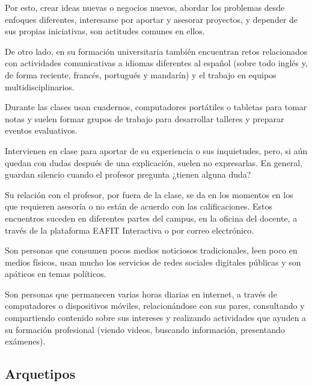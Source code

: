 \documentclass[twoside,letterpaper,11pt]{report}
\begin{document}
Por esto, crear ideas nuevas o negocios nuevos, abordar los problemas desde enfoques diferentes, interesarse por aportar y asesorar proyectos, y depender de sus propias iniciativas, son actitudes comunes en ellos.

De otro lado, en su formación universitaria también encuentran retos relacionados con actividades comunicativas a idiomas diferentes al español (sobre todo inglés y, de forma reciente, francés, portugués y mandarín) y el trabajo en equipos multidisciplinarios.

Durante las clases usan cuadernos, computadores portátiles o tabletas para tomar notas y suelen formar grupos de trabajo para desarrollar talleres y preparar eventos evaluativos. 

Intervienen en clase para aportar de su experiencia o sus inquietudes, pero, si aún quedan con dudas después de una explicación, suelen no expresarlas. En general, guardan silencio cuando el profesor pregunta ¿tienen alguna duda?

Su relación con el profesor, por fuera de la clase, se da en los momentos en los que requieren asesoría o no están de acuerdo con las calificaciones. Estos encuentros suceden en diferentes partes del campus, en la oficina del docente, a través de la plataforma EAFIT Interactiva o por correo electrónico. 

Son personas que consumen pocos medios noticiosos tradicionales, leen poco en medios físicos, usan mucho los servicios de redes sociales digitales públicas y son apáticos en temas políticos.

Son personas que permanecen varias horas diarias en internet, a través de computadores o dispositivos móviles, relacionándose con sus pares, consultando y compartiendo contenido sobre sus intereses y realizando actividades que ayuden a su formación profesional (viendo videos, buscando información, presentando exámenes).

\newpage


\subsection{Arquetipos} %
\label{sub:arquetipos}
\end{document}
